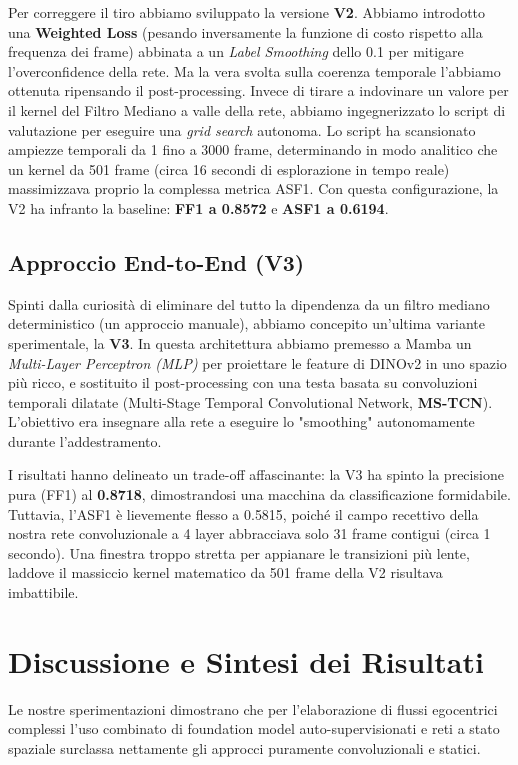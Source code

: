 \documentclass[a4paper,12pt]{report}
\begin{document}
Per correggere il tiro abbiamo sviluppato la versione \textbf{V2}. Abbiamo introdotto una \textbf{Weighted Loss} (pesando inversamente la funzione di costo rispetto alla frequenza dei frame) abbinata a un \emph{Label Smoothing} dello 0.1 per mitigare l'overconfidence della rete. 
Ma la vera svolta sulla coerenza temporale l'abbiamo ottenuta ripensando il post-processing. Invece di tirare a indovinare un valore per il kernel del Filtro Mediano a valle della rete, abbiamo ingegnerizzato lo script di valutazione per eseguire una \emph{grid search} autonoma. Lo script ha scansionato ampiezze temporali da 1 fino a 3000 frame, determinando in modo analitico che un kernel da 501 frame (circa 16 secondi di esplorazione in tempo reale) massimizzava proprio la complessa metrica ASF1.
Con questa configurazione, la V2 ha infranto la baseline: \textbf{FF1 a 0.8572} e \textbf{ASF1 a 0.6194}.

\subsection{Approccio End-to-End (V3)}
Spinti dalla curiosità di eliminare del tutto la dipendenza da un filtro mediano deterministico (un approccio manuale), abbiamo concepito un'ultima variante sperimentale, la \textbf{V3}. 
In questa architettura abbiamo premesso a Mamba un \emph{Multi-Layer Perceptron (MLP)} per proiettare le feature di DINOv2 in uno spazio più ricco, e sostituito il post-processing con una testa basata su convoluzioni temporali dilatate (Multi-Stage Temporal Convolutional Network, \textbf{MS-TCN}). L'obiettivo era insegnare alla rete a eseguire lo "smoothing" autonomamente durante l'addestramento.

I risultati hanno delineato un trade-off affascinante: la V3 ha spinto la precisione pura (FF1) al \textbf{0.8718}, dimostrandosi una macchina da classificazione formidabile. Tuttavia, l'ASF1 è lievemente flesso a 0.5815, poiché il campo recettivo della nostra rete convoluzionale a 4 layer abbracciava solo 31 frame contigui (circa 1 secondo). Una finestra troppo stretta per appianare le transizioni più lente, laddove il massiccio kernel matematico da 501 frame della V2 risultava imbattibile.

\section{Discussione e Sintesi dei Risultati}
Le nostre sperimentazioni dimostrano che per l'elaborazione di flussi egocentrici complessi l'uso combinato di foundation model auto-supervisionati e reti a stato spaziale surclassa nettamente gli approcci puramente convoluzionali e statici.
\end{document}
